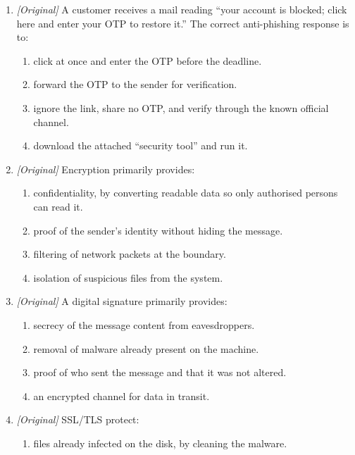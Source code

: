\documentclass[11pt]{article}
\begin{document}
\begin{enumerate}[label=\textbf{Q\arabic*.}, leftmargin=*]
\begin{enumerate}[label=\Alph*.]
    \item a vendor update that fixes known security flaws.
    \item a protocol that encrypts data during transmission.
  \end{enumerate}
\item \textit{[Original]} A customer receives a mail reading ``your account
  is blocked; click here and enter your OTP to restore it.'' The correct
  anti-phishing response is to:
  \begin{enumerate}[label=\Alph*.]
    \item click at once and enter the OTP before the deadline.
    \item forward the OTP to the sender for verification.
    \item ignore the link, share no OTP, and verify through the known official channel.
    \item download the attached ``security tool'' and run it.
  \end{enumerate}
\item \textit{[Original]} Encryption primarily provides:
  \begin{enumerate}[label=\Alph*.]
    \item confidentiality, by converting readable data so only authorised persons can read it.
    \item proof of the sender's identity without hiding the message.
    \item filtering of network packets at the boundary.
    \item isolation of suspicious files from the system.
  \end{enumerate}
\item \textit{[Original]} A digital signature primarily provides:
  \begin{enumerate}[label=\Alph*.]
    \item secrecy of the message content from eavesdroppers.
    \item removal of malware already present on the machine.
    \item proof of who sent the message and that it was not altered.
    \item an encrypted channel for data in transit.
  \end{enumerate}
\item \textit{[Original]} SSL/TLS protect:
  \begin{enumerate}[label=\Alph*.]
    \item files already infected on the disk, by cleaning the malware.

\end{enumerate}
\end{enumerate}
\end{document}
